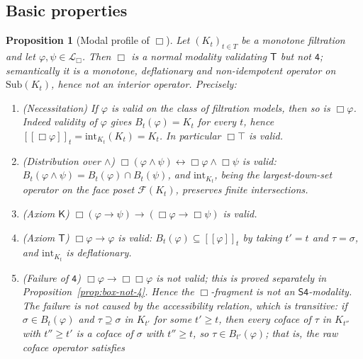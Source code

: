 \documentclass[final,12pt]{elsarticle}
\newcommand{\llbracket}{[\![}
\newcommand{\rrbracket}{]\!]}
\theoremstyle{plain}
\newtheorem{prop}[thm]{Proposition}
\theoremstyle{definition}
\begin{document}
\subsection{Basic properties}

\begin{prop}[Modal profile of \(\Box\)]
\label{prop:modal-profile}
Let \((K_t)_{t\in T}\) be a monotone filtration and let
\(\varphi,\psi \in \mathcal{L}_\Box\).  Then \(\Box\) is a \emph{normal}
modality validating \(\mathsf{T}\) but not \(\mathsf{4}\); semantically it is a
monotone, deflationary and \emph{non-idempotent} operator on
\(\mathrm{Sub}(K_t)\), hence not an interior operator.  Precisely:
\begin{enumerate}
  \item \emph{(Necessitation)} If \(\varphi\) is valid on the class of
        filtration models, then so is \(\Box\varphi\).  Indeed validity of
        \(\varphi\) gives \(B_t(\varphi)=K_t\) for every \(t\), hence
        \(\llbracket\Box\varphi\rrbracket_t=\mathrm{int}_{K_t}(K_t)=K_t\).
        In particular \(\Box\top\) is valid.
  \item \emph{(Distribution over \(\wedge\))}
        \(\Box(\varphi\wedge\psi)\leftrightarrow\Box\varphi\wedge\Box\psi\)
        is valid: \(B_t(\varphi\wedge\psi)=B_t(\varphi)\cap B_t(\psi)\), and
        \(\mathrm{int}_{K_t}\), being the largest-down-set operator on the face
        poset \(\mathcal{F}(K_t)\), preserves finite intersections.
  \item \emph{(Axiom \(\mathsf{K}\))}
        \(\Box(\varphi\to\psi)\to(\Box\varphi\to\Box\psi)\) is \emph{valid}.
  \item \emph{(Axiom \(\mathsf{T}\))} \(\Box\varphi\to\varphi\) is valid:
        \(B_t(\varphi)\subseteq\llbracket\varphi\rrbracket_t\) by taking
        \(t'=t\) and \(\tau=\sigma\), and \(\mathrm{int}_{K_t}\) is deflationary.
  \item \emph{(Failure of \(\mathsf{4}\))} \(\Box\varphi\to\Box\Box\varphi\)
        is \emph{not} valid; this is proved separately in
        Proposition~\ref{prop:box-not-4}.  Hence the \(\Box\)-fragment is not an
        \(\mathsf{S4}\)-modality.  The failure is \emph{not} caused by the
        accessibility relation, which is transitive: if
        \(\sigma\in B_t(\varphi)\) and \(\tau\supseteq\sigma\) in \(K_{t'}\) for
        some \(t'\geq t\), then every coface of \(\tau\) in \(K_{t''}\) with
        \(t''\geq t'\) is a coface of \(\sigma\) with \(t''\geq t\), so
        \(\tau\in B_{t'}(\varphi)\); that is, the raw coface operator satisfies

\end{enumerate}
\end{prop}
\end{document}
